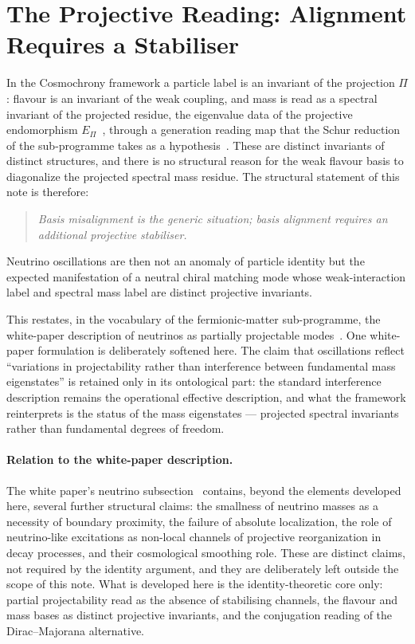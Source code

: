 \documentclass[11pt,a4paper]{article}
\theoremstyle{definition}
\newcommand{\Epi}{E_\Pi}
\begin{document}
  \section{The Projective Reading: Alignment Requires a Stabiliser}
    \label{sec:projective-reading}

    In the Cosmochrony framework a particle label is an invariant of the projection $\Pi$: flavour is an
    invariant of the weak coupling, and mass is read as a spectral invariant of the projected residue, the eigenvalue
    data of the projective endomorphism $\Epi$~\cite{Beau2026q14}, through a generation reading map that the
    Schur reduction of the sub-programme takes as a hypothesis~\cite{Beau2026prs}.
    These are distinct invariants of distinct structures, and there is no structural reason for the weak flavour
    basis to diagonalize the projected spectral mass residue.
    The structural statement of this note is therefore:
    \begin{quote}
      \emph{Basis misalignment is the generic situation; basis alignment requires an additional projective
      stabiliser.}
    \end{quote}
    Neutrino oscillations are then not an anomaly of particle identity but the expected manifestation of a
    neutral chiral matching mode whose weak-interaction label and spectral mass label are distinct projective
    invariants.

    This restates, in the vocabulary of the fermionic-matter sub-programme, the white-paper description of
    neutrinos as partially projectable modes~\cite{Cosmochrony}.
    One white-paper formulation is deliberately softened here.
    The claim that oscillations reflect ``variations in projectability rather than interference between
    fundamental mass eigenstates'' is retained only in its ontological part: the standard interference
    description remains the operational effective description, and what the framework reinterprets is the status
    of the mass eigenstates --- projected spectral invariants rather than fundamental degrees of freedom.

    \paragraph{Relation to the white-paper description.}
    The white paper's neutrino subsection~\cite{Cosmochrony} contains, beyond the elements developed here,
    several further structural claims: the smallness of neutrino masses as a necessity of boundary proximity,
    the failure of absolute localization, the role of neutrino-like excitations as non-local channels of
    projective reorganization in decay processes, and their cosmological smoothing role.
    These are distinct claims, not required by the identity argument, and they are deliberately left outside the
    scope of this note.
    What is developed here is the identity-theoretic core only: partial projectability read as the absence of
    stabilising channels, the flavour and mass bases as distinct projective invariants, and the conjugation
    reading of the Dirac--Majorana alternative.
\end{document}
